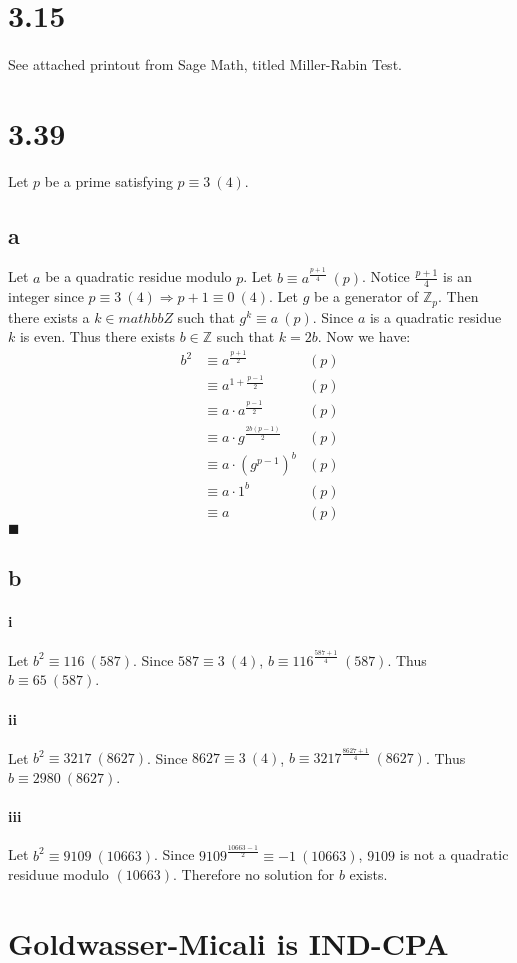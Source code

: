 \documentclass[letterpaper,12pt,oneside,onecolumn]{report}
\begin{document}
\section*{3.15}
\paragraph{}
See attached printout from Sage Math, titled Miller-Rabin Test.
\section*{3.39}
Let $p$ be a prime satisfying $p \equiv 3\ (4)$.
\subsection*{a}
Let $a$ be a quadratic residue modulo $p$. Let $b \equiv a^{\frac{p+1}{4}}\ (p)$. Notice $\frac{p+1}{4}$ is an integer since $p \equiv 3\ (4) \Rightarrow p + 1 \equiv 0\ (4)$. Let $g$ be a generator of $\mathbb{Z}_p$. Then there exists a $k \in mathbb{Z}$ such that $g^k \equiv a\ (p)$. Since $a$ is a quadratic residue $k$ is even. Thus there exists $b \in \mathbb{Z}$ such that $k = 2b$. Now we have:
\begin{align*}
b^2 &\equiv a^{\frac{p+1}{2}} &(p)\\
&\equiv a^{1 + \frac{p-1}{2}} &(p)\\
&\equiv a\cdot a^{\frac{p-1}{2}} &(p)\\
&\equiv a\cdot g^{\frac{2b(p-1)}{2}} &(p)\\
&\equiv a\cdot (g^{p-1})^b &(p)\\
&\equiv a\cdot 1^b &(p)\\
&\equiv a &(p)
\end{align*} $\blacksquare$
\subsection*{b}
\paragraph{i}
Let $b^2 \equiv 116\ (587)$. Since $587 \equiv 3\ (4)$, $b \equiv 116^{\frac{587 + 1}{4}}\ (587)$. Thus $b \equiv 65\ (587)$.
\paragraph{ii}
Let $b^2 \equiv 3217 \ (8627)$. Since $8627 \equiv 3\ (4)$, $b \equiv 3217 ^{\frac{8627 + 1}{4}}\ (8627)$. Thus $b \equiv 2980\ (8627)$.
\paragraph{iii}
Let $b^2 \equiv 9109\ (10663)$. Since $9109^{\frac{10663-1}{2}} \equiv -1\ (10663)$, $9109$ is not a quadratic residuue modulo $(10663)$. Therefore no solution for $b$ exists.
\section*{Goldwasser-Micali is IND-CPA}
\end{document}
